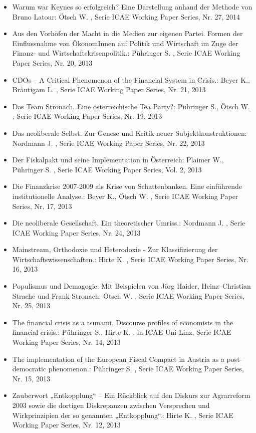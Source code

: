 \begin{itemize}
\item Warum war Keynes so erfolgreich? Eine Darstellung anhand der Methode von Bruno Latour: Ötsch W. , Serie ICAE Working Paper Series, Nr. 27, 2014
\item Aus den Vorhöfen der Macht in die Medien zur eigenen Partei. Formen der Einflussnahme von ÖkonomInnen auf Politik und Wirtschaft im Zuge der Finanz-­ und Wirtschaftskrisenpolitik.: Pühringer S. , Serie ICAE Working Paper Series, Nr. 20, 2013
\item CDOs – A Critical Phenomenon of the Financial System in Crisis.: Beyer K., Bräutigam L. , Serie ICAE Working Paper Series, Nr. 21, 2013
\item Das Team Stronach. Eine österreichische Tea Party?: Pühringer S., Ötsch W. , Serie ICAE Working Paper Series, Nr. 19, 2013
\item Das neoliberale Selbst. Zur Genese und Kritik neuer Subjektkonstruktionen: Nordmann J. , Serie ICAE Working Paper Series, Nr. 22, 2013
\item Der Fiskalpakt und seine Implementation in Österreich: Plaimer W., Pühringer S. , Serie ICAE Working Paper Series, Vol. 2, 2013
\item Die Finanzkrise 2007-2009 als Krise von Schattenbanken. Eine einführende institutionelle Analyse.: Beyer K., Ötsch W. , Serie ICAE Working Paper Series, Nr. 17, 2013
\item Die neoliberale Gesellschaft. Ein theoretischer Umriss.: Nordmann J. , Serie ICAE Working Paper Series, Nr. 24, 2013
\item Mainstream, Orthodoxie und Heterodoxie - Zur Klassifizierung der Wirtschaftswissenschaften.: Hirte K. , Serie ICAE Working Paper Series, Nr. 16, 2013
\item Populismus und Demagogie. Mit Beispielen von Jörg Haider, Heinz–Christian Strache und Frank Stronach: Ötsch W. , Serie ICAE Working Paper Series, Nr. 25, 2013
\item The financial crisis as a tsunami. Discourse profiles of economists in the financial crisis.: Pühringer S., Hirte K. , in ICAE Uni Linz, Serie ICAE Working Paper Series, Nr. 14, 2013
\item The implementation of the European Fiscal Compact in Austria as a post-democratic phenomenon.: Pühringer S. , Serie ICAE Working Paper Series, Nr. 15, 2013
\item Zauberwort „Entkopplung“ – Ein Rückblick auf den Diskurs zur Agrarreform 2003 sowie die dortigen Diskrepanzen zwischen Versprechen und Wirkprinzipien der so genannten „Entkopplung“.: Hirte K. , Serie ICAE Working Paper Series, Nr. 12, 2013

\end{itemize}
